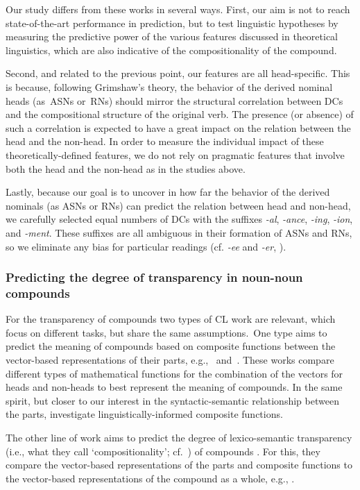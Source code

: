 \documentclass[output=paper]{langsci/langscibook}
\begin{document}
Our study differs from these works in several ways. First, our aim is not to reach state-of-the-art performance in prediction, but to  {test linguistic hypotheses by} measuring the predictive power of the various features discussed in theoretical linguistics, which are also indicative of the  {compositionality} of the compound. 

Second, and related to the previous point, our features are all head-specific. This is because,  following Grimshaw's theory, the behavior of the derived nominal heads (as~ASNs or~RNs) should mirror the structural correlation between DCs and the compositional structure of the original verb. The presence (or absence) of such a correlation is expected to have a great impact on the relation between the head and the non-head. In order to measure the individual impact of these theoretically-defined features, we do not rely on pragmatic features  {that involve both the head and the non-head} as in the studies above.
 

Lastly, because our goal is to uncover in how far the behavior of the derived nominals (as ASNs or RNs) can  predict the relation between head and non-head, we carefully selected  {equal numbers} of DCs with the suffixes \textit{-al}, \textit{-ance},  \textit{-ing},  \textit{-ion}, and  \textit{-ment}. These suffixes are all ambiguous in their formation of ASNs and RNs, so we eliminate any bias for particular readings (cf. \textit{-ee} and \textit{-er}, ).

\subsubsection{Predicting  {the degree of transparency in noun-noun} compounds}\label{sec:NLP:lit:compositional}
For the transparency of  compounds two types of CL work are relevant,  {which} focus on different tasks, but share the same assumptions.\ One type  aims to predict the meaning of compounds based on composite functions between the vector-based representations of their parts, e.g.,~\cite{OSeaghdha:2008} and~\cite{Mitchell:2010}.
These works  compare different types of mathematical functions for the combination of the vectors for heads and non-heads to best represent the  meaning of compounds.  {In the same spirit, but closer to our interest in the syntactic-semantic relationship between the parts, \cite{marelli:baroni:15,baroni:zamparelli:10} investigate linguistically-informed composite functions.}

The other line of work aims to predict the degree of  {lexico-semantic transparency}  {(i.e., what they call \lq compositionality\rq; cf.~)} of compounds {. For this, they compare} the vector-based representations of the parts and composite functions  {to} the vector-based representations of the compound as a whole, e.g., \cite{SchulteImWaldeEtAl:16,Reddy:2011}. 
\end{document}
